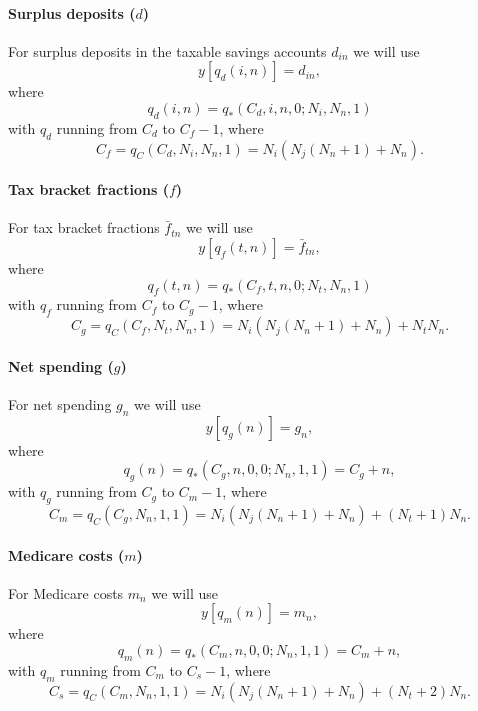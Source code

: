 \documentclass{report}[fleqn,12pt]
\begin{document}
\paragraph*{Surplus deposits (\boldmath$d$)}
For surplus deposits in the taxable savings accounts $d_{in}$ we will use
\begin{equation}
	y[q_d(i, n)] = d_{in},
\end{equation}
where
\begin{equation}
	q_d(i, n) = q_*(C_d, i, n, 0; N_i, N_n, 1)
\end{equation}
with $q_d$ running from $C_d$ to $C_f - 1$, where
\[
	C_f = q_C(C_d, N_i, N_n, 1) = N_i(N_j(N_n+1) + N_n).
\]

\paragraph*{Tax bracket fractions (\boldmath$f$)}
For tax bracket fractions $\bar{f}_{tn}$ we will use
\begin{equation}
	y[q_f(t, n)] = \bar{f}_{tn},
\end{equation}
where
\begin{equation}
	q_f(t, n) = q_*(C_f, t, n, 0; N_t, N_n, 1)
\end{equation}
with $q_f$ running from $C_f$ to $C_g - 1$, where
\[
	C_g = q_C(C_f, N_t, N_n, 1) = N_i(N_j(N_n+1) + N_n) + N_tN_n.
\]

\paragraph*{Net spending (\boldmath$g$)}
For net spending $g_{n}$ we will use
\begin{equation}
	y[q_g(n)] = g_{n},
\end{equation}
where
\begin{equation}
	q_g(n) = q_*(C_g, n, 0, 0; N_n, 1, 1) = C_g + n,
\end{equation}
with $q_g$ running from $C_g$ to $C_m - 1$, where
\[
	C_m = q_C(C_g, N_n, 1, 1) = N_i(N_j(N_n+1) + N_n) + (N_t + 1) N_n.
\]

\paragraph*{Medicare costs (\boldmath$m$)}
For Medicare costs $m_{n}$ we will use
\begin{equation}
	y[q_m(n)] = m_{n},
\end{equation}
where
\begin{equation}
	q_m(n) = q_*(C_m, n, 0, 0; N_n, 1, 1) = C_m + n,
\end{equation}
with $q_m$ running from $C_m$ to $C_s - 1$, where
\[
	C_s = q_C(C_m, N_n, 1, 1) = N_i(N_j(N_n+1) + N_n) + (N_t + 2) N_n.
\]
\end{document}

